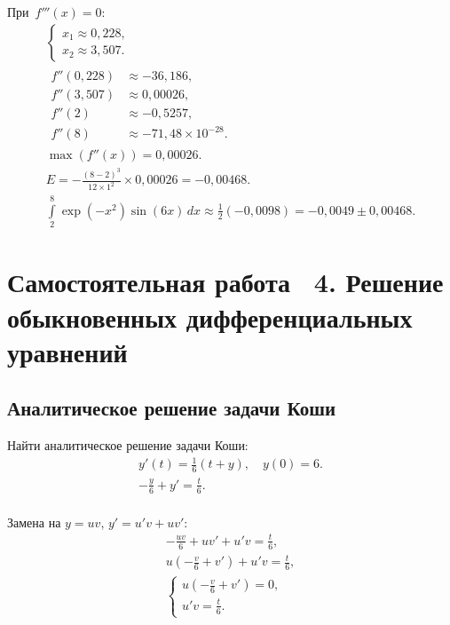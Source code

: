 \documentclass[10pt, a4paper, titlepage, oneside]{article}
\begin{document}
При~$f'''(x) = 0$:
\begin{gather*}
    \begin{cases}
        x_1 \approx 0,228 ,\\
        x_2 \approx 3,507 .
    \end{cases} 
    \\
    \begin{aligned}
        f''(0,228) &\approx -36,186 ,\\
        f''(3,507) &\approx 0,00026 ,\\
        f''(2) &\approx -0,5257 ,\\
        f''(8) &\approx -71,48\times10^{-28} .
    \end{aligned}
    \\
    \max(f''(x))=0,00026 .\\
    E=-\frac{(8-2)^3}{12\times1^2}\times0,00026=-0,00468 .\\
    \int\limits_2^8 \exp(-x^2)\sin(6x)\,dx \approx \frac{1}{2}(-0,0098)=-0,0049\pm0,00468 .
\end{gather*}


\clearpage
\section{Самостоятельная работа \textnumero~4. Решение обыкновенных дифференциальных уравнений}

\subsection*{Аналитическое решение задачи Коши}

Найти аналитическое решение задачи Коши:
\begin{gather*}
    y'(t)=\frac{1}{6}(t+y), \quad y(0)=6 .\\
    -\frac{y}{6}+y'=\frac{t}{6} .\\
\end{gather*}

Замена на $y=uv$, $y'=u'v+uv'$:
\begin{gather*}
    -\frac{uv}{6}+uv'+u'v=\frac{t}{6} ,\\
    u\left(-\frac{v}{6}+v'\right)+u'v = \frac{t}{6} ,\\
    \begin{cases}
        u\left(-\frac{v}{6}+v'\right)=0 ,\\
        u'v=\frac{t}{6} .
    \end{cases}
\end{gather*}
\end{document}
